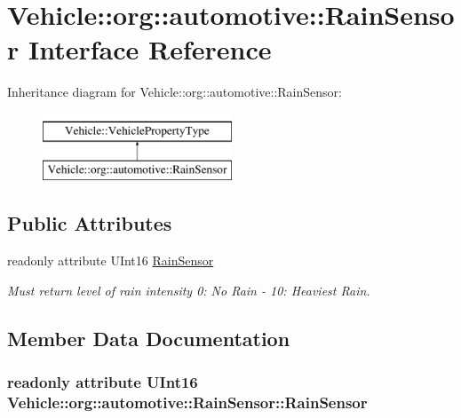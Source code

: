 \hypertarget{interfaceVehicle_1_1org_1_1automotive_1_1RainSensor}{\section{Vehicle\-:\-:org\-:\-:automotive\-:\-:Rain\-Sensor Interface Reference}
\label{interfaceVehicle_1_1org_1_1automotive_1_1RainSensor}
}
Inheritance diagram for Vehicle\-:\-:org\-:\-:automotive\-:\-:Rain\-Sensor\-:\begin{figure}[H]
\begin{center}
\leavevmode
\includegraphics[height=2.000000cm]{interfaceVehicle_1_1org_1_1automotive_1_1RainSensor}
\end{center}
\end{figure}
\subsection*{Public Attributes}
\begin{DoxyCompactItemize}
\item 
readonly attribute U\-Int16 \hyperlink{interfaceVehicle_1_1org_1_1automotive_1_1RainSensor_a1c5810fe6add6d5a7a5707576018654d}{Rain\-Sensor}
\begin{DoxyCompactList}\small\item\em Must return level of rain intensity 0\-: No Rain -\/ 10\-: Heaviest Rain. \end{DoxyCompactList}\end{DoxyCompactItemize}


\subsection{Member Data Documentation}
\hypertarget{interfaceVehicle_1_1org_1_1automotive_1_1RainSensor_a1c5810fe6add6d5a7a5707576018654d}{
\subsubsection[{Rain\-Sensor}]{\setlength{\rightskip}{0pt plus 5cm}readonly attribute U\-Int16 Vehicle\-::org\-::automotive\-::\-Rain\-Sensor\-::\-Rain\-Sensor}}\label{interfaceVehicle_1_1org_1_1automotive_1_1RainSensor_a1c5810fe6add6d5a7a5707576018654d}


